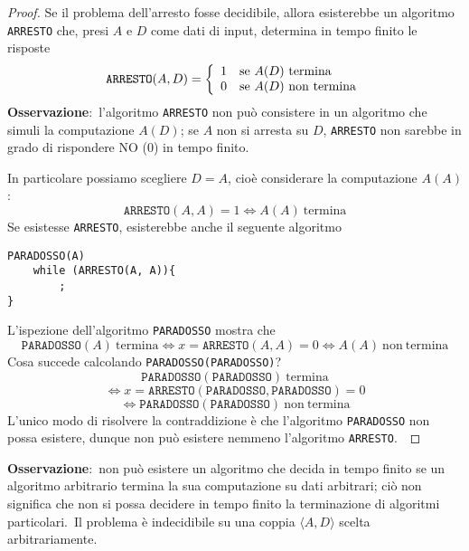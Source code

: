 \begin{proof}

    Se il problema dell'arresto fosse decidibile, allora esisterebbe un algoritmo \texttt{ARRESTO} che, presi $A$ e $D$ come dati di input, determina in tempo finito le risposte
    \[\mathtt{ARRESTO}(A,D) = \left\{\begin{array}{l l}
            1 & \mathrm{se}\ A(D)\ \mathrm{termina}      \\
            0 & \mathrm{se}\ A(D)\ \mathrm{non\ termina} \\
        \end{array}\right.\]
    \textbf{Osservazione}:\ l'algoritmo \texttt{ARRESTO} non può consistere in un algoritmo che simuli la computazione $A(D)$; se $A$ non si arresta su $D$, \texttt{ARRESTO} non sarebbe in grado di rispondere NO (0) in tempo finito.\

    In particolare possiamo scegliere $D = A$, cioè considerare la computazione $A(A)$:
    \[\mathtt{ARRESTO}(A,A) = 1 \Leftrightarrow A(A)\ \mathrm{termina}\]
    Se esistesse \texttt{ARRESTO}, esisterebbe anche il seguente algoritmo

    \begin{verbatim}
PARADOSSO(A)
    while (ARRESTO(A, A)){
        ; 
}
\end{verbatim}

    \noindent L'ispezione dell'algoritmo \texttt{PARADOSSO} mostra che
    \[\mathtt{PARADOSSO}(A)\ \mathrm{termina} \Leftrightarrow x = \mathtt{ARRESTO}(A,A) = 0 \Leftrightarrow A(A)\ \mathrm{non\ termina}\]
    Cosa succede calcolando \texttt{PARADOSSO(PARADOSSO)}?
    \[\mathtt{PARADOSSO}(\mathtt{PARADOSSO})\ \mathrm{termina}\]
    \[\Leftrightarrow x = \mathtt{ARRESTO}(\mathtt{PARADOSSO},\mathtt{PARADOSSO}) = 0\]
    \[\Leftrightarrow \mathtt{PARADOSSO}(\mathtt{PARADOSSO})\ \mathrm{non\ termina}\]
    L'unico modo di risolvere la contraddizione è che l'algoritmo \texttt{PARADOSSO} non possa esistere, dunque non può esistere nemmeno l'algoritmo \texttt{ARRESTO}.\

\end{proof}

\noindent\textbf{Osservazione}:\ non può esistere un algoritmo che decida in tempo finito se un algoritmo arbitrario termina la sua computazione su dati arbitrari; ciò non significa che non si possa decidere in tempo finito la terminazione di algoritmi particolari.\
Il problema è indecidibile su una coppia $\langle A,D\rangle$ scelta arbitrariamente.\

